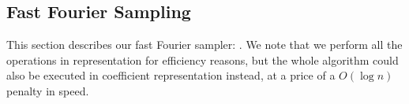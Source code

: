 
%


 
 \subsection{Fast Fourier Sampling}
 
 This section describes our fast Fourier sampler: \longffsampling. We note that we perform all the operations in \fft representation for efficiency reasons, but the whole algorithm could also be executed in coefficient representation instead, at a price of a $O(\log n)$ penalty in speed.
 
 
